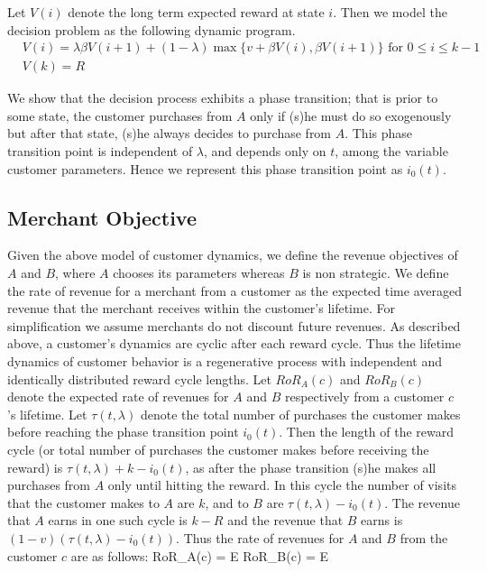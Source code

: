 Let $V(i)$ denote the long term expected reward at state $i$. Then we model the decision problem as the following dynamic program.
\begin{align*}
& V(i) = \lambda \beta V(i+1) + (1-\lambda)\max\{v+\beta V(i),\beta V(i+1) \} \mbox{ for } 0\leq i \leq k-1 \\
& V(k) = R
\end{align*}

We show that the decision process exhibits a phase transition; that is prior to some state, the customer purchases from $A$ only if (s)he must do so exogenously but after that state, (s)he always decides to purchase from $A$. 
This phase transition point is independent of $\lambda$, and depends only on $t$, among the variable customer parameters.
Hence we represent this phase transition point as $i_0(t)$.

\subsection{Merchant Objective}
Given the above model of customer dynamics, we define the revenue objectives of $A$ and $B$, where $A$ chooses its parameters whereas $B$ is non strategic. 
We define the rate of revenue for a merchant from a customer as the expected time averaged revenue that the merchant receives within the customer's lifetime.
For simplification we assume merchants do not discount future revenues.
As described above, a customer's dynamics are cyclic after each reward cycle.
Thus the lifetime dynamics of customer behavior is a regenerative process with independent and identically distributed reward cycle lengths.
Let $RoR_A(c)$ and $RoR_B(c)$ denote the expected rate of revenues for $A$ and $B$ respectively from a customer $c$'s lifetime.
Let $\tau(t, \lambda)$ denote the total number of purchases the customer makes before reaching the phase transition point $i_0(t)$.
Then the length of the reward cycle (or total number of purchases the customer makes before receiving the reward) is $\tau(t, \lambda) + k - i_0(t)$, as after the phase transition (s)he makes all purchases from $A$ only until hitting the reward.
In this cycle the number of visits that the customer makes to $A$ are $k$, and to $B$ are $\tau(t,\lambda) - i_0(t)$.
The revenue that $A$ earns in one such cycle is $k-R$ and the revenue that $B$ earns is $(1-v)(\tau(t,\lambda) - i_0(t))$.
Thus the rate of revenues for $A$ and $B$ from the customer $c$ are as follows:
\beq
RoR_A(c) = \underset{\tau}E\notag
\eeq
\beq
RoR_B(c) = \underset{\tau}E\notag
\eeq

